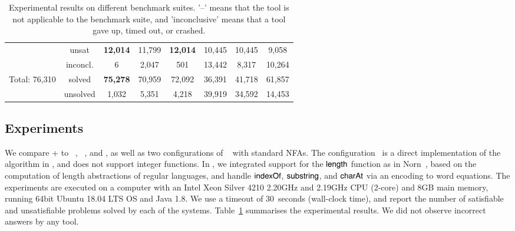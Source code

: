 \begin{table}[tbp]
\begin{center}
\begin{tabular}{|c|c|*{6}{c|}}
\cline{2-8}
 & unsat & \bf{12,014} &  11,799  &\bf{12,014}  & 10,445 & 10,445 &9,058\\
\cline{2-8}
 &\cellcolor{Gray} inconcl. &\cellcolor{Gray}6 & \cellcolor{Gray}2,047  &\cellcolor{Gray}501 & \cellcolor{Gray}13,442 & \cellcolor{Gray}8,317 &\cellcolor{Gray}10,264 \\
\hline 
\hline
\multirow{2}{*}{Total: 76,310} & \cellcolor{Gray} solved & \cellcolor{Gray}\bf{75,278}  & \cellcolor{Gray}70,959 & \cellcolor{Gray}72,092 & \cellcolor{Gray}36,391 & \cellcolor{Gray}41,718 & \cellcolor{Gray}61,857\\
\cline{2-8}
 &  unsolved &1,032  & 5,351  & 4,218 & 39,919 & 34,592 &14,453  \\
\hline
\end{tabular}
\end{center}
\caption{Experimental results on different benchmark suites.  '--' means that the tool is not applicable to the benchmark suite, and 'inconclusive' means that a tool gave up, timed out, or crashed.}
\label{tab-experiment}\vspace{-6mm}
\end{table}%

\vspace{-2mm}
\subsection{Experiments}\label{sec:exp-res}

We compare {\ostrich}+ to {\cvc}~\cite{cvc4}, {\zthree}~\cite{Z3-str},
and {\zthreetrau} \cite{Z3-trau}, as well as two configurations of
\ostrich~\cite{CHL+19} with standard NFAs. The configuration \ostrichi\ is
a direct implementation of the algorithm in \cite{CHL+19}, and does
not support integer functions. In \ostrichii, we integrated support
for the $\mathsf{length}$ function as in Norn~\cite{Abdulla14}, based on the
computation of length abstractions of regular languages, and handle
$\mathsf{indexOf}$, $\mathsf{substring}$, and $\mathsf{charAt}$ via an encoding to word equations.
%
The experiments are executed on a computer with an Intel Xeon Silver 4210 2.20GHz and 2.19GHz CPU (2-core) and 8GB main memory, running 64bit Ubuntu 18.04 LTS OS and Java 1.8. We use a timeout of 30~seconds (wall-clock time), and report the number of satisfiable and unsatisfiable problems solved by each of the systems. Table~\ref{tab-experiment} summarises the experimental results. We did not observe incorrect answers by any tool.

